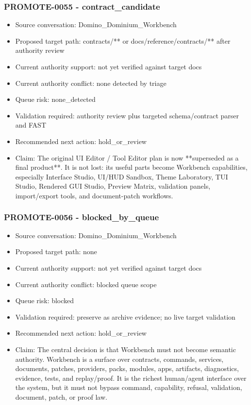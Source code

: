 \documentclass[11pt,a4paper]{report}
\begin{document}
\subsubsection{PROMOTE-0055 - contract\_candidate}

\begin{itemize}
\item Source conversation: Domino\_Dominium\_Workbench
\item Proposed target path: contracts/** or docs/reference/contracts/** after authority review
\item Current authority support: not yet verified against target docs
\item Current authority conflict: none detected by triage
\item Queue risk: none\_detected
\item Validation required: authority review plus targeted schema/contract parser and FAST
\item Recommended next action: hold\_or\_review
\item Claim: The original UI Editor / Tool Editor plan is now **superseded as a final product**. It is not lost: its useful parts become Workbench capabilities, especially Interface Studio, UI/HUD Sandbox, Theme Laboratory, TUI Studio, Rendered GUI Studio, Preview Matrix, validation panels, import/export tools, and document-patch workflows.
\end{itemize}

\subsubsection{PROMOTE-0056 - blocked\_by\_queue}

\begin{itemize}
\item Source conversation: Domino\_Dominium\_Workbench
\item Proposed target path: none
\item Current authority support: not yet verified against target docs
\item Current authority conflict: blocked queue scope
\item Queue risk: blocked
\item Validation required: preserve as archive evidence; no live target validation
\item Recommended next action: hold\_or\_review
\item Claim: The central decision is that Workbench must not become semantic authority. Workbench is a surface over contracts, commands, services, documents, patches, providers, packs, modules, apps, artifacts, diagnostics, evidence, tests, and replay/proof. It is the richest human/agent interface over the system, but it must not bypass command, capability, refusal, validation, document, patch, or proof law.
\end{itemize}
\end{document}
